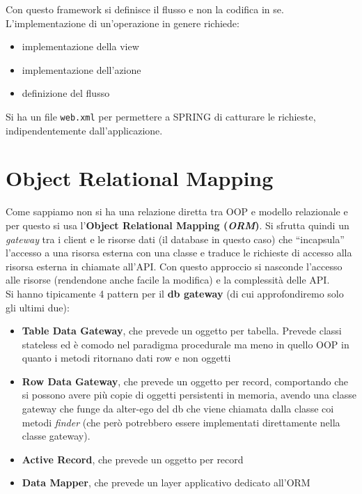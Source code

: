 \documentclass[a4paper,12pt, oneside]{book}
\begin{document}
Con questo framework si definisce il flusso e non la codifica in
se. L'implementazione di un'operazione in genere richiede:
\begin{itemize}
  \item implementazione della view
  \item implementazione dell'azione
  \item definizione del flusso
\end{itemize}
Si ha un file \texttt{web.xml} per permettere a SPRING di catturare le
richieste, indipendentemente dall'applicazione.
\section{Object Relational Mapping}
Come sappiamo non si ha una relazione diretta tra OOP e modello relazionale e
per questo si usa l'\textbf{Object Relational Mapping (\textit{ORM})}. Si
sfrutta quindi un \textit{gateway} tra i client e le risorse dati (il database
in questo caso) che
``incapsula'' l'accesso a una risorsa esterna con una classe e traduce le
richieste di accesso alla risorsa esterna in chiamate all'API. Con questo
approccio si nasconde l'accesso alle risorse (rendendone anche facile la
modifica) e la complessità delle API.\\
Si hanno tipicamente 4 pattern per il \textbf{db gateway} (di cui approfondiremo
solo gli ultimi due):
\begin{itemize}
  \item \textbf{Table Data Gateway}, che prevede un oggetto per tabella. Prevede
  classi stateless ed è comodo nel paradigma procedurale ma meno in quello OOP
  in quanto i metodi ritornano dati row e non oggetti
  \item \textbf{Row Data Gateway}, che prevede un oggetto per record,
  comportando che si possono avere più copie di oggetti persistenti in
  memoria, avendo una classe gateway che funge da alter-ego del db che viene
  chiamata dalla classe coi metodi \textit{finder} (che però potrebbero essere
  implementati direttamente nella classe gateway). 
  \item \textbf{Active Record}, che prevede un oggetto per record
  \item \textbf{Data Mapper}, che prevede un layer applicativo dedicato all'ORM
\end{itemize}
\end{document}
